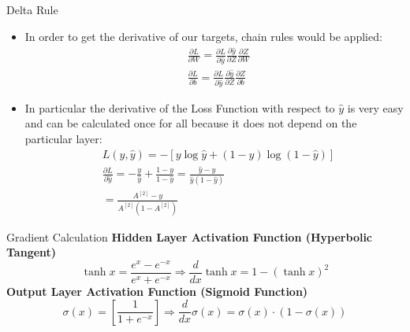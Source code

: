 \documentclass[11pt]{beamer}
\begin{document}
\begin{frame}{Delta Rule}
\begin{itemize}
\item In order to get the derivative of our targets, chain rules would be applied:
\begin{align*}
&\frac{\partial L}{\partial W} =  \frac{\partial L}{\partial \hat y} \frac{\partial \hat y}{\partial Z} \frac{\partial Z}{\partial W} \\
&\frac{\partial L}{\partial b} =  \frac{\partial L}{\partial \hat y} \frac{\partial \hat y}{\partial Z} \frac{\partial Z}{\partial b} 
\end{align*}
\item In particular the derivative of the Loss Function with respect to $\hat y$ is very easy and can be calculated once for all because it does not depend on the particular layer:
\begin{align*}
&L(y, \hat{y}) = -[y\log{\hat{y}} + (1 - y)\log{(1 - \hat{y})}] \\
&\frac{\partial L}{\partial \hat y} = -\frac{y}{\hat y} + \frac{1-y}{1-\hat y} = \frac{\hat y - y}{\hat y(1 - \hat y)} \\
&= \frac{A^{[2]} - y}{A^{[2]}(1 - A^{[2]})}
\end{align*}
\end{itemize}
\end{frame}
\begin{frame}{Gradient Calculation}
\textbf{Hidden Layer Activation Function (Hyperbolic Tangent)}
\begin{equation}
\tanh x = \frac{{{e^x} -{e^{- x}}}}{{{e^x} + {e^{ -x}}}} 
\Rightarrow 
\frac{d}{{dx}}\tanh x =  1-{\left(\tanh x \right)}^2 
\end{equation}
\textbf{Output Layer Activation Function (Sigmoid Function)} 
\begin{equation}
\sigma(x) =  \left[ \dfrac{1}{1 + e^{-x}} \right]  \Rightarrow
\dfrac{d}{dx} \sigma(x) =  \sigma(x) \cdot (1 - \sigma(x))
\end{equation}
\end{frame}
\end{document}
